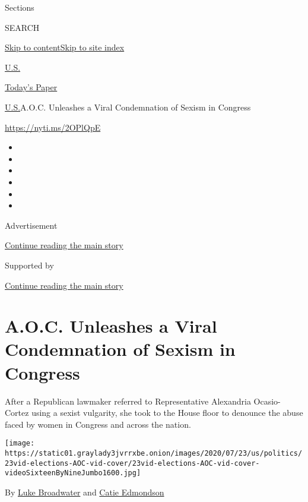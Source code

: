 Sections

SEARCH

\protect\hyperlink{site-content}{Skip to
content}\protect\hyperlink{site-index}{Skip to site index}

\href{https://www.nytimes3xbfgragh.onion/section/us}{U.S.}

\href{https://myaccount.nytimes3xbfgragh.onion/auth/login?response_type=cookie\&client_id=vi}{}

\href{https://www.nytimes3xbfgragh.onion/section/todayspaper}{Today's
Paper}

\href{/section/us}{U.S.}\textbar{}A.O.C. Unleashes a Viral Condemnation
of Sexism in Congress

\url{https://nyti.ms/2OPlQpE}

\begin{itemize}
\item
\item
\item
\item
\item
\item
\end{itemize}

Advertisement

\protect\hyperlink{after-top}{Continue reading the main story}

Supported by

\protect\hyperlink{after-sponsor}{Continue reading the main story}

\hypertarget{aoc-unleashes-a-viral-condemnation-of-sexism-in-congress}{%
\section{A.O.C. Unleashes a Viral Condemnation of Sexism in
Congress}\label{aoc-unleashes-a-viral-condemnation-of-sexism-in-congress}}

After a Republican lawmaker referred to Representative Alexandria
Ocasio-Cortez using a sexist vulgarity, she took to the House floor to
denounce the abuse faced by women in Congress and across the nation.

\texttt{[image: https://static01.graylady3jvrrxbe.onion/images/2020/07/23/us/politics/23vid-elections-AOC-vid-cover/23vid-elections-AOC-vid-cover-videoSixteenByNineJumbo1600.jpg]}

By \href{https://www.nytimes3xbfgragh.onion/by/luke-broadwater}{Luke
Broadwater} and
\href{https://www.nytimes3xbfgragh.onion/by/catie-edmondson}{Catie
Edmondson}

